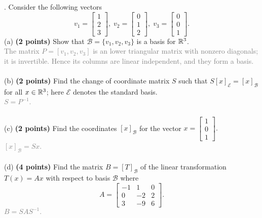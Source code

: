 \documentclass[12pt,a4paper]{article}
\newcommand{\gray}[1]{\textcolor{gray}{#1}}
\renewcommand{\l}{\left}
\renewcommand{\r}{\right}
\def\R{\ifmmode\mathbb R\fi}
\begin{document}
\newpage
{}. Consider the following vectors
\[
v_1 = 
\l[
\begin{array}{c}
    1\\2\\3
\end{array}
\r]
, \;
v_2 = 
\l[
\begin{array}{c}
    0\\1\\2
\end{array}
\r]
, \;
v_3 = 
\l[
\begin{array}{c}
    0\\0\\1
\end{array}
\r].
\]
(a) \textbf{(2 points) }Show that $\mathcal B = \{v_1, v_2, v_3\}$ is a basis for $\R^3$.\\
\gray{The matrix $P = [v_1, v_2, v_3]$ is an lower triangular matrix with nonzero diagonals; it is invertible. Hence its columns are linear independent, and they form a basis. \\}
\\
(b) \textbf{(2 points) }Find the change of coordinate matrix $S$ such that $S[x]_{\mathcal E} = [x]_{\mathcal B}$ for all $x \in \R^3$; here $\mathcal E$ denotes the standard basis. \\
\gray{$S = P^{-1}$. \\}
\\
(c) \textbf{(2 points) }Find the coordinates $[x]_{\mathcal B}$ for the vector $x = \l[
\begin{array}{c}
    1\\0\\1
\end{array}
\r].$ \\
\gray{$[x]_{\mathcal B} = Sx$. \\}
\\
(d) \textbf{(4 points) }Find the matrix $B = [T]_{\mathcal B}$ of the linear transformation $T(x) = Ax$ with respect to basis $\mathcal B$ where 
\[
    A = \l[
\begin{array}{ccc}
    -1 & 1 & 0 \\
    0 & -2 & 2 \\
    3 & -9 & 6
\end{array}
\r].
\]
\gray{$B = SAS^{-1}.$\\}
\end{document}
